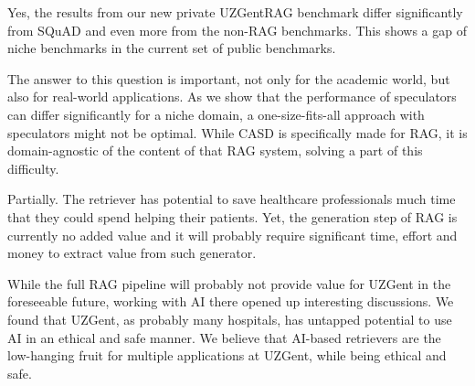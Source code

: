 \begin{tcolorbox}[colback=blue-ish-light,colframe=blue-ish,title=\textbf{RQ2:} Does a real-world benchmark in a niche domain show significantly different results from existing speculative decoding benchmarks?, coltitle=white]
    Yes, the results from our new private UZGentRAG benchmark differ significantly from SQuAD and even more from the non-RAG benchmarks. This shows a gap of niche benchmarks in the current set of public benchmarks.
\end{tcolorbox}

The answer to this question is important, not only for the academic world, but also for real-world applications. As we show that the performance of speculators can differ significantly for a niche domain, a one-size-fits-all approach with speculators might not be optimal. While CASD is specifically made for RAG, it is domain-agnostic of the content of that RAG system, solving a part of this difficulty.

\begin{tcolorbox}[colback=blue-ish-light,colframe=blue-ish,title=\textbf{RQ3:} Can a RAG system provide additional value at UZGent?, coltitle=white]
    Partially. The retriever has potential to save healthcare professionals much time that they could spend helping their patients. Yet, the generation step of RAG is currently no added value and it will probably require significant time, effort and money to extract value from such generator.
\end{tcolorbox}

While the full RAG pipeline will probably not provide value for UZGent in the foreseeable future, working with AI there opened up interesting discussions. We found that UZGent, as probably many hospitals, has untapped potential to use AI in an ethical and safe manner. We believe that AI-based retrievers are the low-hanging fruit for multiple applications at UZGent, while being ethical and safe.\\

